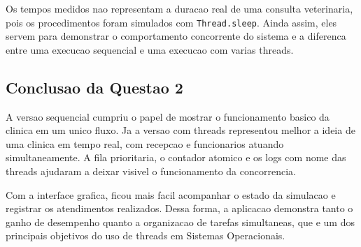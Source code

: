 Os tempos medidos nao representam a duracao real de uma consulta veterinaria, pois os procedimentos foram simulados com \texttt{Thread.sleep}. Ainda assim, eles servem para demonstrar o comportamento concorrente do sistema e a diferenca entre uma execucao sequencial e uma execucao com varias threads.

\subsection{Conclusao da Questao 2}

A versao sequencial cumpriu o papel de mostrar o funcionamento basico da clinica em um unico fluxo. Ja a versao com threads representou melhor a ideia de uma clinica em tempo real, com recepcao e funcionarios atuando simultaneamente. A fila prioritaria, o contador atomico e os logs com nome das threads ajudaram a deixar visivel o funcionamento da concorrencia.

Com a interface grafica, ficou mais facil acompanhar o estado da simulacao e registrar os atendimentos realizados. Dessa forma, a aplicacao demonstra tanto o ganho de desempenho quanto a organizacao de tarefas simultaneas, que e um dos principais objetivos do uso de threads em Sistemas Operacionais.
